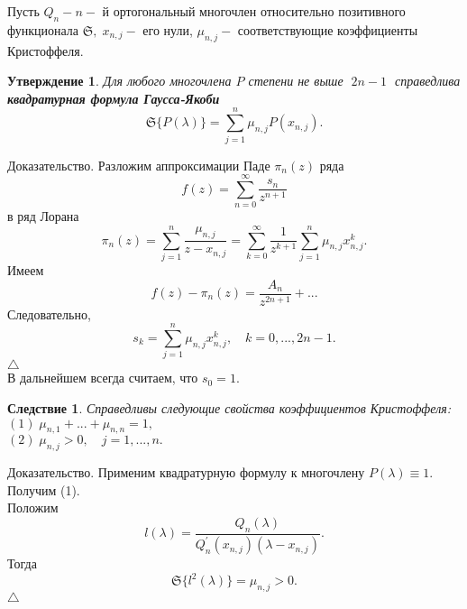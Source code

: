 \documentclass[12 pt, a4 paper]{article}
\theoremstyle{plain}   \newtheorem{Pro}{Задача}
\newtheorem{Sta}{Утверждение}
\newtheorem{Cor}{Следствие}
\begin{document}
Пусть
$ Q_n - n- $
й ортогональный многочлен относительно позитивного функционала
$ \mathfrak{S} , \; x_{n,j} - $
его нули,
$ \mu _{n,j} - $
соответствующие коэффициенты Кристоффеля.
\begin{Sta}
Для любого многочлена
$ P $
степени не выше
$ \; 2n-1 \; $
справедлива
{\bfseries квадратурная формула Гаусса-Якоби}
$$
  \mathfrak{S} \{ P(\lambda ) \} =
  \sum _{j=1}^n \mu _{n,j} P(x_{n,j}).
$$
\end{Sta}
{\Large Доказательство.}
Разложим аппроксимации Паде
$ \pi _n (z) $
ряда
$$
  f(z)=\sum _{n=0}^{\infty} \frac{s_n}{z^{n+1}}
$$
в ряд Лорана
$$
  \pi _n (z)= \sum _{j=1}^n \frac{\mu _{n,j}}{z-x_{n,j}}=
  \sum _{k=0}^{\infty}\frac{1}{z^{k+1}}
  \sum _{j=1}^n \mu _{n,j} x_{n,j}^k .
$$
Имеем
$$
  f(z)-\pi _n (z)=\frac{A_n}{z^{2n+1}}+...
$$
Следовательно,
$$
  s_k =\sum _{j=1}^n \mu _{n,j}x_{n,j}^k ,
  \quad k=0,...,2n-1.
$$
$ \triangle $
\\
В дальнейшем всегда считаем, что
$ s_0 =1. $
\begin{Cor}
Справедливы следующие свойства коэффициентов Кристоффеля:
\\
$ (1) \; \mu _{n,1}+...+\mu_{n,n}=1, $
\\
$ (2) \; \mu _{n,j}>0, \quad j=1,...,n. $
\end{Cor}
{\Large Доказательство.}
Применим квадратурную формулу к многочлену
$ P(\lambda )\equiv 1. $
Получим (1).\\
Положим
$$
  l(\lambda )=\frac{Q_n (\lambda )}
  {Q_n ^{\prime}(x_{n,j})(\lambda -x_{n,j})}.
$$
Тогда
$$
  \mathfrak{S} \{ l^2 (\lambda ) \} = \mu _{n,j}>0.
$$
$ \triangle $
\newpage      					
\end{document}
